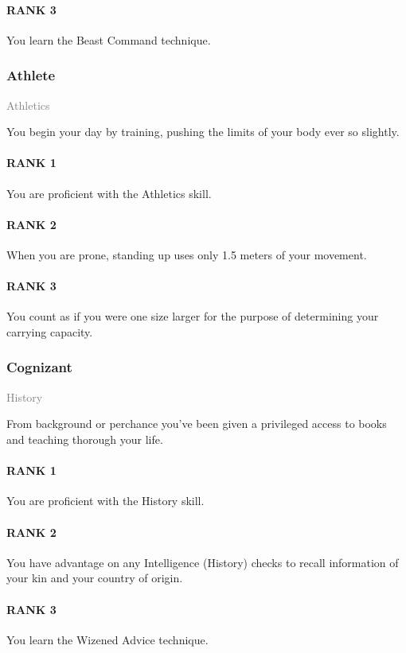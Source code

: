 \paragraph{RANK 3} You learn the Beast Command technique.
\subsubsection{Athlete} \label{feat::athlete}
\small \textcolor{gray}{Athletics}

\normalsize
You begin your day by training, pushing the limits of your body ever so slightly.
\paragraph{RANK 1} You are proficient with the Athletics skill.
\paragraph{RANK 2} When you are prone, standing up uses only 1.5 meters of your movement.
\paragraph{RANK 3} You count as if you were one size larger for the purpose of determining your carrying capacity.

\subsubsection{Cognizant} \label{feat::cognizant}
\small{\textcolor{gray}{History}}

\normalsize
From background or perchance you've been given a privileged access to books and teaching thorough your life.
\paragraph{RANK 1} You are proficient with the History skill.
\paragraph{RANK 2} You have advantage on any Intelligence (History) checks to recall information of your kin and your country of origin.
\paragraph{RANK 3} You learn the Wizened Advice technique.


